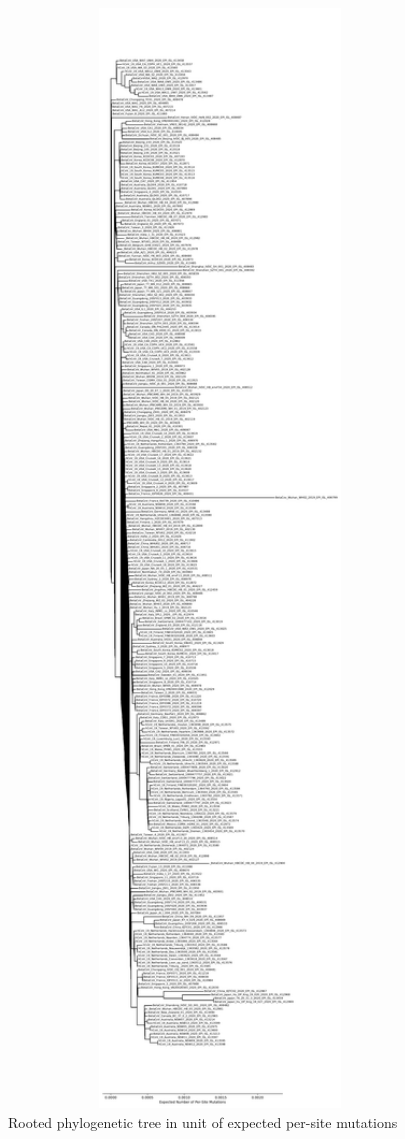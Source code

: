 \documentclass{article}
\begin{document}
\begin{figure}[h]
\centering
\includegraphics[width=1\textwidth,height=1\textheight,keepaspectratio]{./figs/tree_mutations.pdf}
\caption{Rooted phylogenetic tree in unit of expected per-site mutations}
\end{figure}
\end{document}
